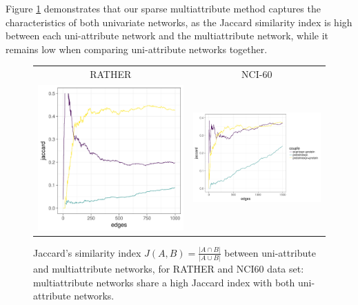 Figure \ref{fig:jaccard} demonstrates that our sparse multiattribute
method captures the characteristics of both univariate networks, as
the Jaccard similarity index is high between each uni-attribute
network and the multiattribute network, while it remains low when
comparing uni-attribute networks together.
\begin{figure}[htbp!]
  \centering
  \begin{tabular}{@{}cc@{}}
   RATHER & NCI-60 \\
    \includegraphics[width=.35\textwidth]{figures/jaccard_RATHER}
  & \includegraphics[width=.5\textwidth]{figures/jaccard_NCI60}
  \end{tabular}
  \caption{Jaccard's similarity index
    $J(A,B) = \frac{\left|A\cap B\right|}{\left|A\cup B\right|}$
    between uni-attribute and multiattribute networks, for RATHER and
    NCI60 data set: multiattribute networks share a high Jaccard
    index with both uni-attribute networks.}
  \label{fig:jaccard}
\end{figure}

